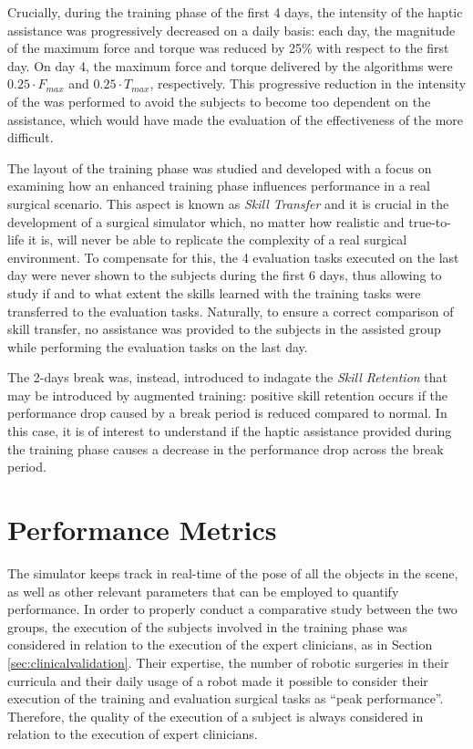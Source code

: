 \documentclass[../main.tex]{subfiles}
\begin{document}
Crucially, during the training phase of the first 4 days, the intensity of the haptic assistance was progressively decreased on a daily basis: each day, the magnitude of the maximum force and torque was reduced by 25\% with respect to the first day. On day 4, the maximum force and torque delivered by the \vf algorithms were $0.25\cdot F_{max}$ and $0.25\cdot T_{max}$, respectively. This progressive reduction in the intensity of the \vfs was performed to avoid the subjects to become too dependent on the assistance, which would have made the evaluation of the effectiveness of the \vfs more difficult.

The layout of the training phase was studied and developed with a focus on examining how an enhanced training phase influences performance in a real surgical scenario. This aspect is known as \textit{Skill Transfer} and it is crucial in the development of a surgical simulator which, no matter how realistic and true-to-life it is, will never be able to replicate the complexity of a real surgical environment. To compensate for this, the 4 evaluation tasks executed on the last day were never shown to the subjects during the first 6 days, thus allowing to study if and to what extent the skills learned with the training tasks were transferred to the evaluation tasks. Naturally, to ensure a correct comparison of skill transfer, no assistance was provided to the subjects in the assisted group while performing the evaluation tasks on the last day.

The 2-days break was, instead, introduced to indagate the \textit{Skill Retention} that may be introduced by augmented training: positive skill retention occurs if the performance drop caused by a break period is reduced compared to normal. In this case, it is of interest to understand if the haptic assistance provided during the training phase causes a decrease in the performance drop across the break period.

\section{Performance Metrics}   
The simulator keeps track in real-time of the pose of all the objects in the scene, as well as other relevant parameters that can be employed to quantify performance. In order to properly conduct a comparative study between the two groups, the execution of the subjects involved in the training phase was considered in relation to the execution of the expert clinicians, as in Section \ref{sec:clinicalvalidation}. Their expertise, the number of robotic surgeries in their curricula and their daily usage of a \davinci robot made it possible to consider their execution of the training and evaluation surgical tasks as ``peak performance''. Therefore, the quality of the execution of a subject is always considered in relation to the execution of expert clinicians.
\end{document}
